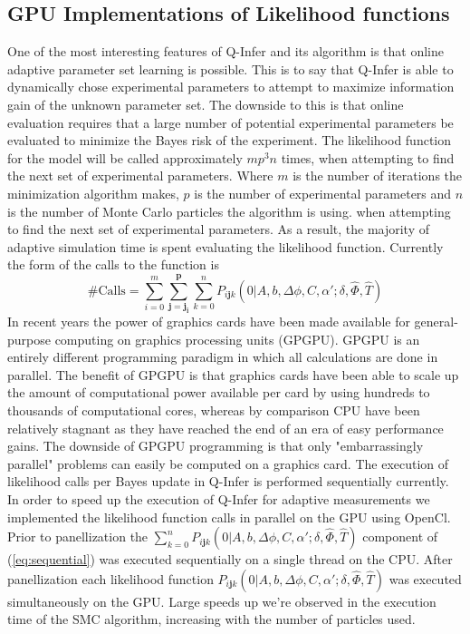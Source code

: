 \subsection{GPU Implementations of Likelihood functions}
One of the most interesting features of Q-Infer and its algorithm is that online adaptive parameter set learning is possible. This is to say that Q-Infer is able to dynamically chose experimental parameters to attempt to maximize information gain of the unknown parameter set. The downside to this is that online evaluation requires that a large number of potential experimental parameters be evaluated to minimize the Bayes risk of the experiment. The likelihood function for the model will be called approximately $mp^3n$ times, when attempting to find the next set of experimental parameters. Where $m$ is the number of iterations the minimization algorithm makes, $p$ is the number of experimental parameters and $n$ is the number of Monte Carlo particles the algorithm is using. when attempting to find the next set of experimental parameters. As a result, the majority of adaptive simulation time is spent evaluating the likelihood function. Currently the form of the calls to the function is
\begin{equation}
\text{\# Calls} = \sum \limits_{i=0}^m \sum \limits_{\mathbf{j}=\mathbf{j_i}}^\mathbf{p} \sum \limits_{k=0}^n P_{i\mathbf{j}k}(0|A,b,\Delta\phi,C,\alpha';\delta,\hat{\Phi},\hat{T})
\label{eq:sequential}
\end{equation} 
In recent years the power of graphics cards have been made available for general-purpose computing on graphics processing units (GPGPU). GPGPU is an entirely different programming paradigm in which all calculations are done in parallel. The benefit of GPGPU is that graphics cards have been able to scale up the amount of computational power available per card by using hundreds to thousands of computational cores, whereas by comparison CPU have been relatively stagnant as they have reached the end of an era of easy performance gains.\cite{gpuvscpu} The downside of GPGPU programming is that only "embarrassingly parallel" problems can easily be computed on a graphics card. The execution of likelihood calls per Bayes update in Q-Infer is performed sequentially currently. In order to speed up the execution of Q-Infer for adaptive measurements we implemented the likelihood function calls in parallel on the GPU using OpenCl.\cite{opencl} Prior to panellization the $\sum \limits_{k=0}^n P_{i\mathbf{j}k}(0|A,b,\Delta\phi,C,\alpha';\delta,\hat{\Phi},\hat{T})$ component of (\ref{eq:sequential}) was executed sequentially on a single thread on the CPU. After panellization each likelihood function $P_{i\mathbf{j}k}(0|A,b,\Delta\phi,C,\alpha';\delta,\hat{\Phi},\hat{T})$ was executed simultaneously on the GPU. Large speeds up we're observed in the execution time of the SMC algorithm, increasing with the number of particles used. 